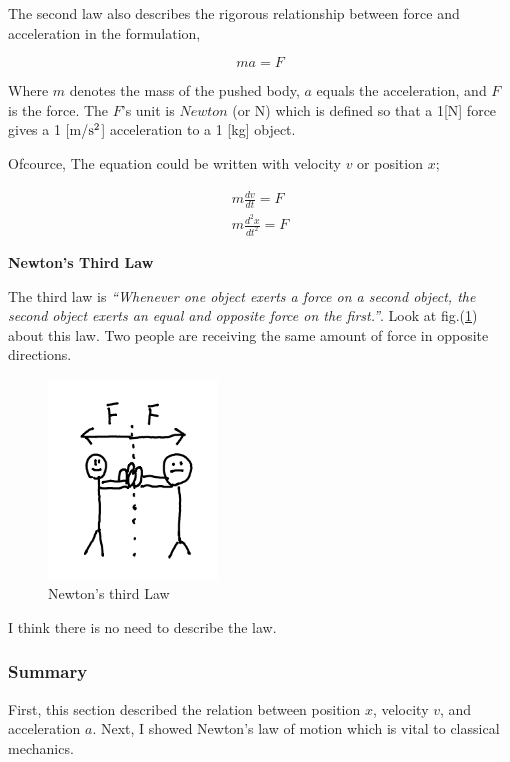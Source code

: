 \documentclass[pdflatex,sn-mathphys-num]{sn-jnl}%
\theoremstyle{thmstyleone}%
\theoremstyle{thmstyletwo}%
\theoremstyle{thmstylethree}%
\begin{document}
The second law also describes the rigorous relationship between force and acceleration in the formulation, 

\begin{equation}
	ma = F
\end{equation}

Where $m$ denotes the mass of the pushed body, $a$ equals the acceleration, and $F$ is the force. The $F$'s unit is $Newton$ (or N) which is defined so that a 1[N] force gives a 1 [m/$\rm s^2$] acceleration to a 1 [kg] object.

Ofcource, The equation could be written with velocity $v$ or position $x$;

\begin{eqnarray}
	m\frac{dv}{dt} = F\\
	m\frac{d^2 x}{dt^2} = F
\end{eqnarray}

\vspace{2truemm}

{\noindent\rm\bf\large Newton's Third Law}

The third law is {\sl ``Whenever one object exerts a force on a second object, the second object exerts an equal and opposite force on the first.''}. Look at fig.(\ref{NewT}) about this law. Two people are receiving the same amount of force in opposite directions.

\begin{figure}[H]
	\centering
	\includegraphics[width=0.4\textwidth]{images/NewtonsThirdLaw.png}
	\caption{Newton's third Law}
	\label{NewT}
\end{figure}

I think there is no need to describe the law.

\subsubsection{Summary}
First, this section described the relation between position $x$, velocity $v$, and acceleration $a$. Next, I showed Newton's law of motion which is vital to classical mechanics.
\end{document}
